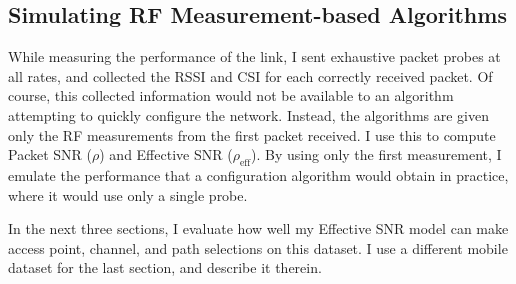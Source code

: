 \subsection{Simulating RF Measurement-based Algorithms}
While measuring the performance of the link, I sent exhaustive packet probes at all rates, and collected the RSSI and CSI for each correctly received packet. Of course, this collected information would not be available to an algorithm attempting to quickly configure the network. Instead, the algorithms are given only the RF measurements from the first packet received. I use this to compute Packet SNR ($\rho$) and Effective SNR ($\rho_\text{eff}$). By using only the first measurement, I emulate the performance that a configuration algorithm would obtain in practice, where it would use only a single probe.

In the next three sections, I evaluate how well my Effective SNR model can make access point, channel, and path selections on this dataset. I use a different mobile dataset for the last section, and describe it therein.